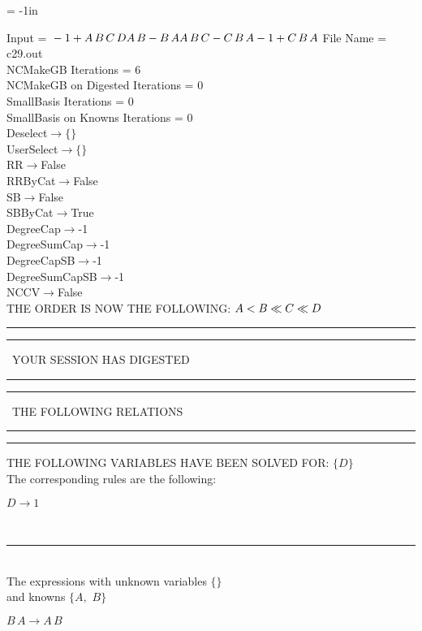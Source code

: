 \voffset = -1in
\evensidemargin 0.1in
\oddsidemargin 0.1in
\textheight 9in
\textwidth 6in

\normalsize
\baselineskip=12pt
\noindent
Input = 
$
\\-1 + A\,
 B\,
 C\,
 D\\
A\,
 B - B\,
 A\\
A\,
 B\,
 C - C\,
 B\,
 A\\
-1 + C\,
 B\,
 A\\
$
File Name = c29.out\\
NCMakeGB Iterations = 6\\
NCMakeGB on Digested Iterations = 0\\
SmallBasis Iterations = 0\\
SmallBasis on Knowns Iterations = 0\\
Deselect$\rightarrow \{\}$\\
UserSelect$\rightarrow \{\}$\\
RR$\rightarrow $False\\
RRByCat$\rightarrow $False\\
SB$\rightarrow $False\\
SBByCat$\rightarrow $True\\
DegreeCap$\rightarrow $-1\\
DegreeSumCap$\rightarrow $-1\\
DegreeCapSB$\rightarrow $-1\\
DegreeSumCapSB$\rightarrow $-1\\
NCCV$\rightarrow $False\\
THE ORDER IS NOW THE FOLLOWING:\hfil\break
$
A<B\ll
C\ll
D\\
$
\rule[2pt]{6in}{4pt}\hfil\break
\rule[2pt]{1.879in}{4pt}
\ YOUR SESSION HAS DIGESTED\ 
\rule[2pt]{1.879in}{4pt}\hfil\break
\rule[2pt]{1.923in}{4pt}
\ THE FOLLOWING RELATIONS\ 
\rule[2pt]{1.923in}{4pt}\hfil\break
\rule[2pt]{6in}{4pt}\hfil\break
THE FOLLOWING VARIABLES HAVE BEEN SOLVED FOR:\hfil\break
$\{D\}$
\smallskip\\
The corresponding rules are the following:\smallskip\\
\begin{minipage}{6in}
$
D\rightarrow 1
$
\end{minipage}\medskip\\
\rule[3pt]{6in}{.7pt}\\
The expressions with unknown variables $\{\}$\\
and knowns $\{A,
$ $
B\}$\smallskip\\
\begin{minipage}{6in}
$
B\,
 A\rightarrow A\,
 B
$
\end{minipage}\\
